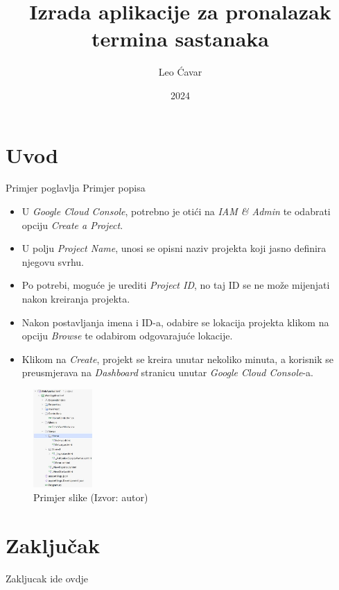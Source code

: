 \documentclass{foi}
\title{Izrada aplikacije za pronalazak termina sastanaka}
\author{Leo Ćavar}
\date{2024}
\begin{document}
\maketitle

\tableofcontents

\pagestyle{plain}

\chapter{Uvod}
Primjer poglavlja\cite{API}
\newpage
Primjer popisa\cite{Tyler2024}
\begin{itemize}
    \item U \textit{Google Cloud Console}, potrebno je otići na \textit{IAM \& Admin} te odabrati opciju \textit{Create a Project}.
    \item U polju \textit{Project Name}, unosi se opisni naziv projekta koji jasno definira njegovu svrhu.
    \item Po potrebi, moguće je urediti \textit{Project ID}, no taj ID se ne može mijenjati nakon kreiranja projekta.
    \item Nakon postavljanja imena i ID-a, odabire se lokacija projekta klikom na opciju \textit{Browse} te odabirom odgovarajuće lokacije.
    \item Klikom na \textit{Create}, projekt se kreira unutar nekoliko minuta, a korisnik se preusmjerava na \textit{Dashboard} stranicu unutar \textit{Google Cloud Console}-a.
\end{itemize}

\newpage

\begin{figure}[H]
    \centering
    \includegraphics[width=0.2\textwidth]{slike/MVC_project.jpeg}
    \caption{Primjer slike (Izvor: autor)}
    \label{fig:mvc_projekt}
\end{figure}


\chapter{Zaključak}

Zakljucak ide ovdje
\printbibliography[title=Popis literature]

\listoffigures
{}
\end{document}
